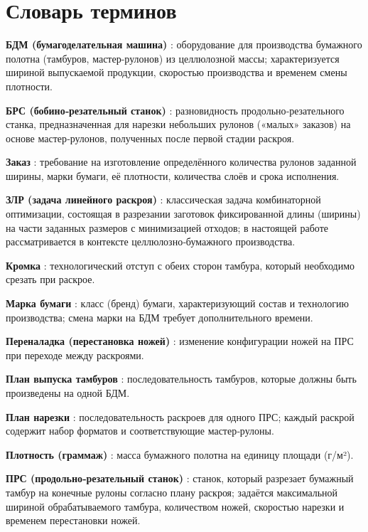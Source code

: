 \chapter*{Словарь терминов}             %


\textbf{БДМ (бумагоделательная машина)} : оборудование для производства бумажного полотна (тамбуров, мастер-рулонов) из целлюлозной массы; характеризуется шириной выпускаемой продукции, скоростью производства и временем смены плотности.

\textbf{БРС (бобино‑резательный станок)} : разновидность продольно‑резательного станка, предназначенная для нарезки небольших рулонов («малых» заказов) на основе мастер‑рулонов, полученных после первой стадии раскроя.

\textbf{Заказ} : требование на изготовление определённого количества рулонов заданной ширины, марки бумаги, её плотности, количества слоёв и срока исполнения.

\textbf{ЗЛР (задача линейного раскроя)} : классическая задача комбинаторной оптимизации, состоящая в разрезании заготовок фиксированной длины (ширины) на части заданных размеров с минимизацией отходов; в настоящей работе рассматривается в контексте целлюлозно‑бумажного производства.

\textbf{Кромка} : технологический отступ с обеих сторон тамбура, который необходимо срезать при раскрое.

\textbf{Марка бумаги} : класс (бренд) бумаги, характеризующий состав и технологию производства; смена марки на БДМ требует дополнительного времени.

\textbf{Переналадка (перестановка ножей)} : изменение конфигурации ножей на ПРС при переходе между раскроями.

\textbf{План выпуска тамбуров} : последовательность тамбуров, которые должны быть произведены на одной БДМ.

\textbf{План нарезки} : последовательность раскроев для одного ПРС; каждый раскрой содержит набор форматов и соответствующие мастер‑рулоны.

\textbf{Плотность (граммаж)} : масса бумажного полотна на единицу площади (г/м²).

\textbf{ПРС (продольно‑резательный станок)} : станок, который разрезает бумажный тамбур на конечные рулоны согласно плану раскроя; задаётся максимальной шириной обрабатываемого тамбура, количеством ножей, скоростью нарезки и временем перестановки ножей.

